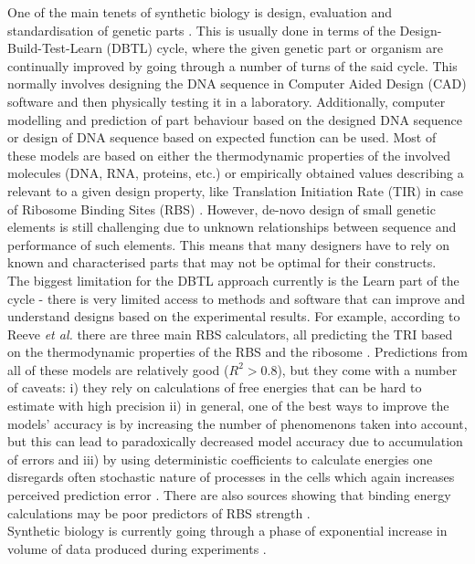 \documentclass{article}
\begin{document}
One of the main tenets of synthetic biology is design, evaluation and standardisation of genetic parts \cite{Brophy2014,Canton2008,Stanton2014}.
This is usually done in terms of the Design-Build-Test-Learn (DBTL) cycle, where the given genetic part or organism are continually improved by going through a number of turns of the said cycle.
This normally involves designing the DNA sequence in Computer Aided Design (CAD) software and then physically testing it in a laboratory. 
Additionally, computer modelling and prediction of part behaviour based on the designed DNA sequence or design of DNA sequence based on expected function can be used\cite{Yeoh2019,Nielsen2016}.
Most of these models are based on either the thermodynamic properties of the involved molecules (DNA, RNA, proteins, etc.) or empirically obtained values describing a relevant to a given design property, like Translation Initiation Rate (TIR) in case of Ribosome Binding Sites (RBS) \cite{Xia1998,Chen2013,Reeve2014}.
However, de-novo design of small genetic elements is still challenging due to unknown relationships between sequence and performance of such elements. 
This means that many designers have to rely on known and characterised parts that may not be optimal for their constructs.\\
The biggest limitation for the DBTL approach currently is the Learn part of the cycle - there is very limited access to methods and software that can improve and understand designs based on the experimental results.
For example, according to Reeve \emph{et al.} there are three main RBS calculators, all predicting the TRI based on the thermodynamic properties of the RBS and the ribosome \cite{Seo2013,Na2010,Salis2009}. 
Predictions from all of these models are relatively good ($R^2 >0.8$), but they come with a number of caveats: i) they rely on calculations of free energies that can be hard to estimate with high precision ii) in general, one of the best ways to improve the models' accuracy is by increasing the number of phenomenons taken into account, but this can lead to paradoxically decreased model accuracy due to accumulation of errors \cite{EspahBorujeni2016} and iii) by using deterministic coefficients to calculate energies one disregards often stochastic nature of processes in the cells which again increases perceived prediction error \cite{Goss1998}. 
There are also sources showing that binding energy calculations may be poor predictors of RBS strength \cite{Saito2020,Sherer1980}.\\
Synthetic biology is currently going through a phase of exponential increase in volume of data produced during experiments \cite{Freemont2019}. 
\end{document}
